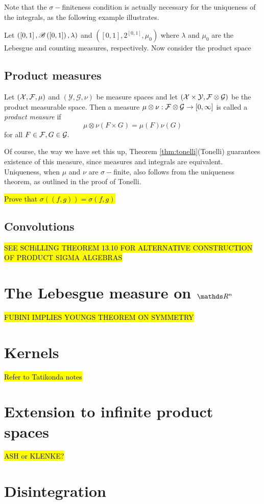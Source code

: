 Note that the $\sigma-$finiteness condition is actually necessary
for the uniqueness of the integrals, as the following example illustrates.
\begin{example}
\label{exa:tonelliFailNonSigmaFinite}Let $\left(\left[0,1\right],\mathscr{B}\left(\left[0,1\right]\right),\lambda\right)$
and $\left(\left[0,1\right],2^{\left[0,1\right]},\mu_{0}\right)$
where $\lambda$ and $\mu_{0}$ are the Lebesgue and counting measures,
respectively. Now consider the product space $ $
\end{example}


\subsection{Product measures}
\begin{defn}
\label{def:productMeasure}Let $\left(\mathcal{X},\mathcal{F},\mu\right)$ and $\left(\mathcal{Y},\mathcal{G},\nu\right)$
be measure spaces and let $\left(\mathcal{X}\times\mathcal{Y},\mathcal{F}\otimes\mathcal{G}\right)$
be the product measurable space. Then a measure $\mu\otimes\nu:\mathcal{F}\otimes\mathcal{G}\to\left[0,\infty\right]$
is called a \emph{product measure }if
\[
\mu\otimes\nu\left(F\times G\right)=\mu\left(F\right)\nu\left(G\right)
\]
for all $F\in\mathcal{F},G\in\mathcal{G}.$
\end{defn}

Of course, the way we have set this up, Theorem \ref{thm:tonelli}(Tonelli)
guarantees existence of this measure, since measures and integrals
are equivalent. Uniqueness, when $\mu$ and $\nu$ are $\sigma-$finite,
also follows from the uniqueness theorem, as outlined in the proof
of Tonelli.

\hl{Prove that $\sigma(\left(f,g\right)) = \sigma(f,g)$ }

\subsection{Convolutions}

\hl{SEE SCHiLLING THEOREM 13.10 FOR ALTERNATIVE CONSTRUCTION OF PRODUCT SIGMA ALGEBRAS}

\section{The Lebesgue measure on $\protect\R^{n}$}

\hl{FUBINI IMPLIES YOUNGS THEOREM ON SYMMETRY}

\section{Kernels}

\hl{Refer to Tatikonda notes}

\section{Extension to infinite product spaces}

\hl{ASH or KLENKE?}

\section{Disintegration}
